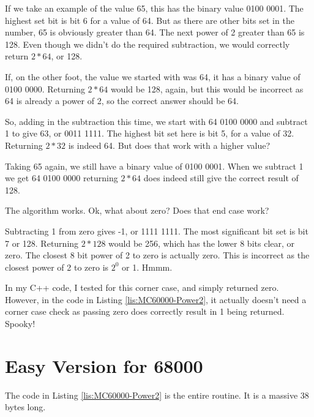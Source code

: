 If we take an example of the value 65, this has the binary value 0100
0001. The highest set bit is bit 6 for a value of 64. But as there
are other bits set in the number, 65 is obviously greater than 64.
The next power of 2 greater than 65 is 128. Even though we didn't
do the required subtraction, we would correctly return $2*64$, or
128.

If, on the other foot, the value we started with was 64, it has a
binary value of 0100 0000. Returning $2*64$ would be 128, again,
but this would be incorrect as 64 is already a power of 2, so the
correct answer should be 64.

So, adding in the subtraction this time, we start with 64 \textendash{}
0100 0000 \textendash{} and subtract 1 to give 63, or 0011 1111. The
highest bit set here is bit 5, for a value of 32. Returning $2*32$
is indeed 64. But does that work with a higher value?

Taking 65 again, we still have a binary value of 0100 0001. When we
subtract 1 we get 64 \textendash{} 0100 0000 \textendash{} returning
$2*64$ does indeed still give the correct result of 128.

The algorithm works. Ok, what about zero? Does that end case work?

Subtracting 1 from zero gives -1, or 1111 1111. The most significant
bit set is bit 7 or 128. Returning $2*128$ would be 256, which has
the lower 8 bits clear, or zero. The closest 8 bit power of 2 to zero
is actually zero. This is incorrect as the closest power of 2 to zero
is $2^{0}$ or 1. Hmmm.

In my C++ code, I tested for this corner case, and simply returned
zero. However, in the code in Listing \ref{lis:MC60000-Power2}, it
actually doesn't need a corner case check as passing zero does correctly
result in 1 being returned. Spooky!

\section{Easy Version for 68000}

The code in Listing \ref{lis:MC60000-Power2} is the entire routine.
It is a massive 38 bytes long.

